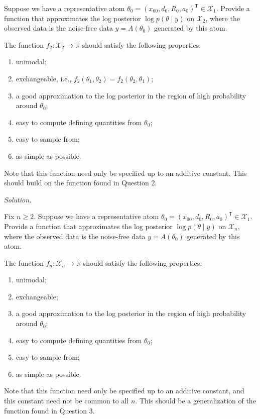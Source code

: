 \documentclass{homework}
\newcommand*{\R}{\mathbb R}
\begin{document}
\pagebreak
\question*{}  
Suppose we have a representative atom $\theta_0=(x_{00},d_0,R_0,a_0)^{\mathsf T}\in\mathcal{X}_1$.
Provide a function that approximates the log posterior $\log p(\theta\mid y)$ on $\mathcal{X}_2$, 
where the observed data is the noise-free data $y=A(\theta_0)$ generated by this atom.

The function $f_2: \mathcal{X}_2 \to \R$ should satisfy the following properties:
\begin{enumerate}
    \item unimodal;
    \item exchangeable, i.e., $f_2(\theta_1, \theta_2) = f_2(\theta_2, \theta_1)$;
    \item a good approximation to the log posterior in the region of high probability around $\theta_0$;
    \item easy to compute defining quantities from $\theta_0$;
    \item easy to sample from;
    \item as simple as possible.
\end{enumerate}

Note that this function need only be specified up to an additive constant.
This should build on the function found in Question 2.

\textit{Solution.} 


\pagebreak
\question*{}  
Fix $n \geq 2$. 
Suppose we have a representative atom $\theta_0=(x_{00},d_0,R_0,a_0)^{\mathsf T}\in\mathcal{X}_1$.
Provide a function that approximates the log posterior $\log p(\theta\mid y)$ on $\mathcal{X}_n$, 
where the observed data is the noise-free data $y=A(\theta_0)$ generated by this atom. 

The function $f_n: \mathcal{X}_n \to \R$ should satisfy the following properties:
\begin{enumerate}
    \item unimodal;
    \item exchangeable;
    \item a good approximation to the log posterior in the region of high probability around $\theta_0$;
    \item easy to compute defining quantities from $\theta_0$;
    \item easy to sample from;
    \item as simple as possible.
\end{enumerate}

Note that this function need only be specified up to an additive constant, 
and this constant need not be common to all $n$.
This should be a generalization of the function found in Question 3.
\end{document}
